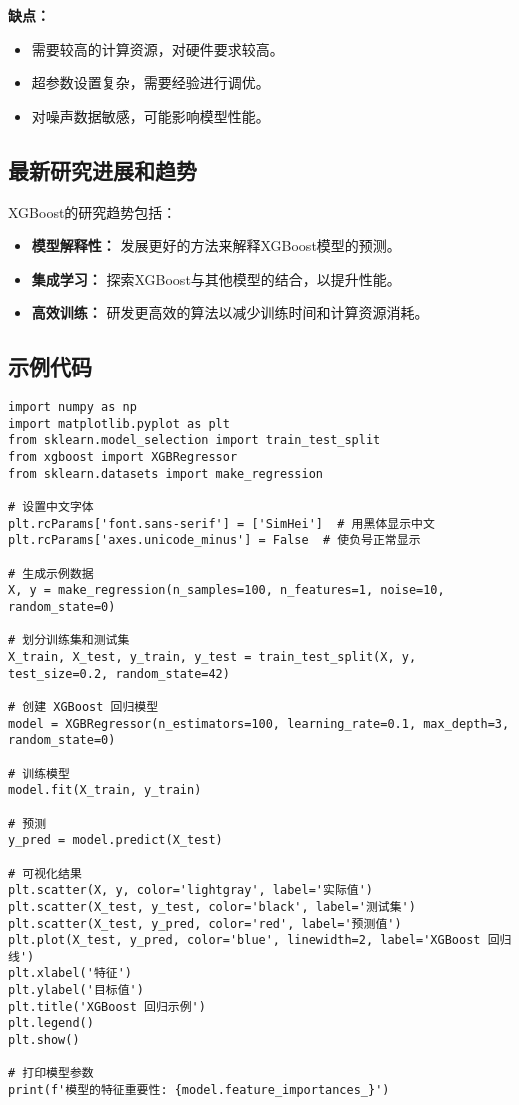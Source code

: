 \textbf{缺点：}
\begin{itemize}
    \item 需要较高的计算资源，对硬件要求较高。
    \item 超参数设置复杂，需要经验进行调优。
    \item 对噪声数据敏感，可能影响模型性能。
\end{itemize}

\subsection*{最新研究进展和趋势}
XGBoost的研究趋势包括：
\begin{itemize}
    \item \textbf{模型解释性：} 发展更好的方法来解释XGBoost模型的预测。
    \item \textbf{集成学习：} 探索XGBoost与其他模型的结合，以提升性能。
    \item \textbf{高效训练：} 研发更高效的算法以减少训练时间和计算资源消耗。
\end{itemize}
\subsection{示例代码}

\begin{lstlisting}
import numpy as np
import matplotlib.pyplot as plt
from sklearn.model_selection import train_test_split
from xgboost import XGBRegressor
from sklearn.datasets import make_regression

# 设置中文字体
plt.rcParams['font.sans-serif'] = ['SimHei']  # 用黑体显示中文
plt.rcParams['axes.unicode_minus'] = False  # 使负号正常显示

# 生成示例数据
X, y = make_regression(n_samples=100, n_features=1, noise=10, random_state=0)

# 划分训练集和测试集
X_train, X_test, y_train, y_test = train_test_split(X, y, test_size=0.2, random_state=42)

# 创建 XGBoost 回归模型
model = XGBRegressor(n_estimators=100, learning_rate=0.1, max_depth=3, random_state=0)

# 训练模型
model.fit(X_train, y_train)

# 预测
y_pred = model.predict(X_test)

# 可视化结果
plt.scatter(X, y, color='lightgray', label='实际值')
plt.scatter(X_test, y_test, color='black', label='测试集')
plt.scatter(X_test, y_pred, color='red', label='预测值')
plt.plot(X_test, y_pred, color='blue', linewidth=2, label='XGBoost 回归线')
plt.xlabel('特征')
plt.ylabel('目标值')
plt.title('XGBoost 回归示例')
plt.legend()
plt.show()

# 打印模型参数
print(f'模型的特征重要性: {model.feature_importances_}')

\end{lstlisting}

